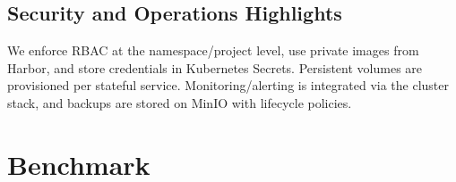 \documentclass[a4paper,12pt]{report}
\begin{document}
\begin{doublespace}
\subsection{Security and Operations Highlights}
\hspace{1cm}We enforce RBAC at the namespace/project level, use private images from Harbor, and store credentials in Kubernetes Secrets. Persistent volumes are provisioned per stateful service. Monitoring/alerting is integrated via the cluster stack, and backups are stored on MinIO with lifecycle policies.

\end{doublespace}


\section{Benchmark}
\end{document}
